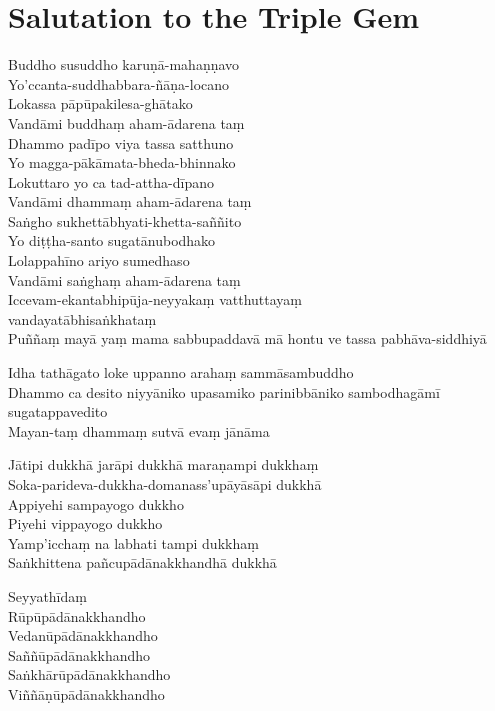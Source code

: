 \section*{Salutation to the Triple Gem}

\begin{leader}
\end{leader}


Buddho susuddho karuṇā-mahaṇṇavo\\
Yo'ccanta-suddhabbara-ñāṇa-locano\\
Lokassa pāpūpakilesa-ghātako\\
Vandāmi buddhaṃ aham-ādarena taṃ\\
Dhammo padīpo viya tassa satthuno\\
Yo magga-pākāmata-bheda-bhinnako\\
Lokuttaro yo ca tad-attha-dīpano\\
Vandāmi dhammaṃ aham-ādarena taṃ\\
Saṅgho sukhettābhyati-khetta-saññito\\
Yo diṭṭha-santo sugatānubodhako\\
Lolappahīno ariyo sumedhaso\\
Vandāmi saṅghaṃ aham-ādarena taṃ\\
Iccevam-ekantabhipūja-neyyakaṃ vatthuttayaṃ \\vandayatābhisaṅkhataṃ\\
Puññaṃ mayā yaṃ mama sabbupaddavā mā hontu ve tassa pabhāva-siddhiyā

Idha tathāgato loke uppanno arahaṃ sammāsambuddho\\
Dhammo ca desito niyyāniko upasamiko parinibbāniko sambodhagāmī sugatappavedito\\
Mayan-taṃ dhammaṃ sutvā evaṃ jānāma

Jātipi dukkhā jarāpi dukkhā maraṇampi dukkhaṃ\\
Soka-parideva-dukkha-domanass'upāyāsāpi dukkhā\\
Appiyehi sampayogo dukkho\\
Piyehi vippayogo dukkho\\
Yamp'icchaṃ na labhati tampi dukkhaṃ\\
Saṅkhittena pañcupādānakkhandhā dukkhā

Seyyathīdaṃ\\
Rūpūpādānakkhandho\\
Vedanūpādānakkhandho\\
Saññūpādānakkhandho\\
Saṅkhārūpādānakkhandho\\
Viññāṇūpādānakkhandho

